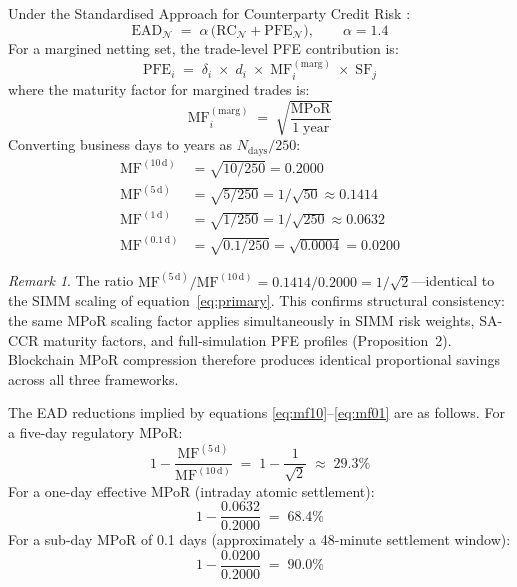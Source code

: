 \documentclass[12pt,letterpaper]{article}
\numberwithin{equation}{section}
\theoremstyle{remark}
\newtheorem{remark}{Remark}[section]
\newcommand{\MF}{\mathrm{MF}}
\newcommand{\EAD}{\mathrm{EAD}}
\newcommand{\MPoR}{\mathrm{MPoR}}
\begin{document}
Under the Standardised Approach for Counterparty Credit Risk
\citep[CRE52]{bcbs_2014}:
\begin{equation}
  \EAD_{\mathcal{N}} \;=\;
  \alpha\,\bigl(\mathrm{RC}_{\mathcal{N}} + \mathrm{PFE}_{\mathcal{N}}\bigr),
  \qquad \alpha = 1.4
  \label{eq:ead}
\end{equation}
For a margined netting set, the trade-level PFE contribution is:
\begin{equation}
  \mathrm{PFE}_i \;=\; \delta_i\;\times\; d_i\;\times\;
  \MF_i^{(\mathrm{marg})}\;\times\;\mathrm{SF}_j
  \label{eq:pfesaccr}
\end{equation}
where the maturity factor for margined trades is:
\begin{equation}
  \MF_i^{(\mathrm{marg})} \;=\;
  \sqrt{\frac{\MPoR}{1\;\mathrm{year}}}
  \label{eq:mf}
\end{equation}
Converting business days to years as $N_{\mathrm{days}}/250$:
\begin{align}
  \MF^{(10\,\mathrm{d})} &= \sqrt{10/250} = 0.2000 \label{eq:mf10}\\
  \MF^{(5\,\mathrm{d})}  &= \sqrt{5/250}  = 1/\sqrt{50} \approx 0.1414
  \label{eq:mf5}\\
  \MF^{(1\,\mathrm{d})}  &= \sqrt{1/250}  = 1/\sqrt{250} \approx 0.0632
  \label{eq:mf1}\\
  \MF^{(0.1\,\mathrm{d})}&= \sqrt{0.1/250}= \sqrt{0.0004} = 0.0200
  \label{eq:mf01}
\end{align}

\begin{remark}
  The ratio $\MF^{(5\,\mathrm{d})}/\MF^{(10\,\mathrm{d})} =
  0.1414/0.2000 = 1/\sqrt{2}$---identical to the SIMM scaling of
  equation~\eqref{eq:primary}. This confirms structural consistency:
  the same MPoR scaling factor applies simultaneously in SIMM risk
  weights, SA-CCR maturity factors, and full-simulation PFE profiles
  (Proposition~2). Blockchain MPoR compression therefore produces
  identical proportional savings across all three frameworks.
\end{remark}

The EAD reductions implied by equations \eqref{eq:mf10}--\eqref{eq:mf01}
are as follows. For a five-day regulatory MPoR:
\begin{equation}
  1 - \frac{\MF^{(5\,\mathrm{d})}}{\MF^{(10\,\mathrm{d})}}
  \;=\; 1 - \frac{1}{\sqrt{2}} \;\approx\; 29.3\%
  \label{eq:ead5}
\end{equation}
For a one-day effective MPoR (intraday atomic settlement):
\begin{equation}
  1 - \frac{0.0632}{0.2000} \;=\; 68.4\%
  \label{eq:ead1}
\end{equation}
For a sub-day MPoR of 0.1 days (approximately a 48-minute settlement window):
\begin{equation}
  1 - \frac{0.0200}{0.2000} \;=\; 90.0\%
  \label{eq:ead01}
\end{equation}
\end{document}
